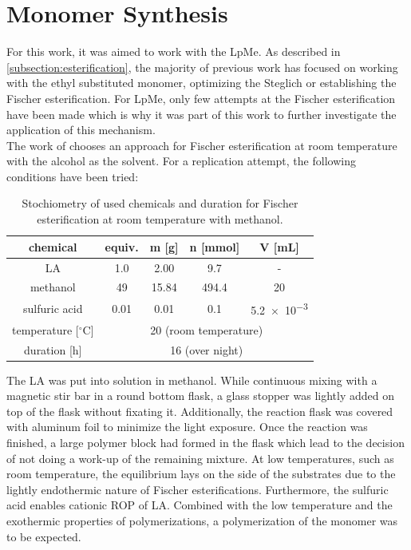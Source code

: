 \documentclass[11pt]{scrreport}
\let\cite=\supercite
\begin{document}
	\section{Monomer Synthesis}
	For this work, it was aimed to work with the \gls{LpMe}. As described in \autoref{subsection:esterification}, the majority of previous work has focused on working with the ethyl substituted monomer, optimizing the Steglich or establishing the Fischer esterification. For \gls{LpMe}, only few attempts at the Fischer esterification have been made which is why it was part of this work to further investigate the application of this mechanism.\\
	The work of \citeauthor{bauer_secondary_2021} chooses an approach for Fischer esterification at room temperature with the alcohol as the solvent. For a replication attempt, the following conditions have been tried: \cite{bauer_secondary_2021}
	\begin{table}[H]
		\centering
		\caption[Used chemicals and duration for Fischer esterification at room temperature with methanol.]{\centering Stochiometry of used chemicals and duration for Fischer esterification at room temperature with methanol.}
		\begin{tabular}{|c|cccc|}
			\hline
			\textbf{chemical} & \multicolumn{1}{c|}{\textbf{equiv.}} & \multicolumn{1}{c|}{\textbf{m [g]}} & \multicolumn{1}{c|}{\textbf{n [mmol]}} & \textbf{V [mL]} \\ \hline
			\gls{LA} & \multicolumn{1}{c|}{1.0} & \multicolumn{1}{c|}{2.00} & \multicolumn{1}{c|}{9.7} & - \\ \hline
			methanol & \multicolumn{1}{c|}{49} & \multicolumn{1}{c|}{15.84} & \multicolumn{1}{c|}{494.4} & 20 \\ \hline
			sulfuric acid & \multicolumn{1}{c|}{0.01} & \multicolumn{1}{c|}{0.01} & \multicolumn{1}{c|}{0.1} & \num{5.2e-3} \\ \hhline{|=|=|=|=|=|}
			temperature [$^\circ\mathrm{C}$] & \multicolumn{4}{c|}{20 (room temperature)} \\ \hline
			duration [h] & \multicolumn{4}{c|}{16 (over night)} \\ \hline
		\end{tabular}\label{tab:Fischer_RT}
	\end{table}\noindent
	The \gls{LA} was put into solution in methanol. While continuous mixing with a magnetic stir bar in a round bottom flask, a glass stopper was lightly added on top of the flask without fixating it. Additionally, the reaction flask was covered with aluminum foil to minimize the light exposure. Once the reaction was finished, a large polymer block had formed in the flask which lead to the decision of not doing a work-up of the remaining mixture. At low temperatures, such as room temperature, the equilibrium lays on the side of the substrates due to the lightly endothermic nature of Fischer esterifications. Furthermore, the sulfuric acid enables cationic \gls{ROP} of \gls{LA}. Combined with the low temperature and the exothermic properties of polymerizations, a polymerization of the monomer was to be expected.\cite{khan_current_2021}\\
\end{document}
